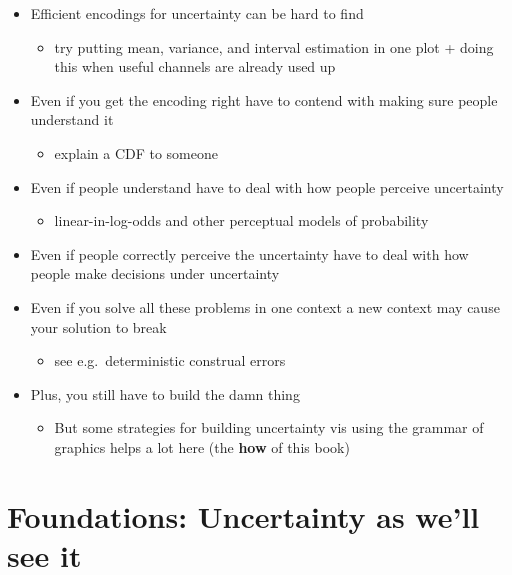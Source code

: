 \documentclass[]{book}
\providecommand{\tightlist}{%
  \setlength{\itemsep}{0pt}\setlength{\parskip}{0pt}}
\theoremstyle{definition}
\theoremstyle{definition}
\theoremstyle{definition}
\theoremstyle{remark}
\begin{document}
\begin{itemize}
\tightlist
\item
  Efficient encodings for uncertainty can be hard to find

  \begin{itemize}
  \tightlist
  \item
    try putting mean, variance, and interval estimation in one plot +
    doing this when useful channels are already used up
  \end{itemize}
\item
  Even if you get the encoding right have to contend with making sure
  people understand it

  \begin{itemize}
  \tightlist
  \item
    explain a CDF to someone
  \end{itemize}
\item
  Even if people understand have to deal with how people perceive
  uncertainty

  \begin{itemize}
  \tightlist
  \item
    linear-in-log-odds and other perceptual models of probability
  \end{itemize}
\item
  Even if people correctly perceive the uncertainty have to deal with
  how people make decisions under uncertainty
\item
  Even if you solve all these problems in one context a new context may
  cause your solution to break

  \begin{itemize}
  \tightlist
  \item
    see e.g.~deterministic construal errors
  \end{itemize}
\item
  Plus, you still have to build the damn thing

  \begin{itemize}
  \tightlist
  \item
    But some strategies for building uncertainty vis using the grammar
    of graphics helps a lot here (the \textbf{how} of this book)
  \end{itemize}
\end{itemize}

\chapter{Foundations: Uncertainty as we'll see it}\label{ch-uncertainty}
\end{document}
